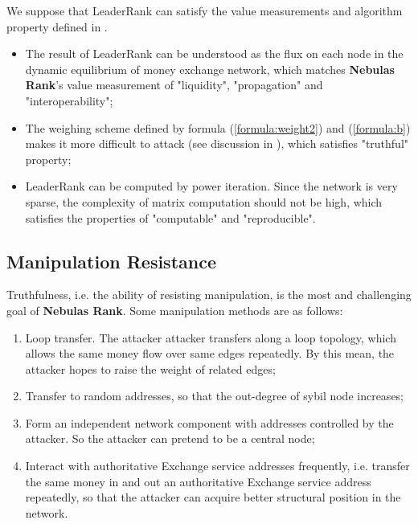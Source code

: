 We suppose that LeaderRank can satisfy the value measurements and algorithm property defined in .
\begin{itemize}
	\item The result of LeaderRank can be understood as the flux on each node in the dynamic equilibrium of money exchange network, which matches \textbf{Nebulas Rank}'s value measurement of "liquidity", "propagation" and "interoperability";
	\item The weighing scheme defined by formula (\ref{formula:weight2}) and (\ref{formula:b}) makes it more difficult to attack (see discussion in ), which satisfies "truthful" property;
	\item LeaderRank can be computed by power iteration. Since the network is very sparse, the complexity of matrix computation should not be high, which satisfies the properties of "computable" and "reproducible".
\end{itemize}


\subsection{Manipulation Resistance}\label{subsec:robust}
Truthfulness, i.e. the ability of resisting manipulation, is the most and challenging goal of \textbf{Nebulas Rank}. Some manipulation methods are as follows:
\begin{enumerate}
	\item Loop transfer. The attacker attacker transfers along a loop topology, which allows the same money flow over same edges repeatedly. By this mean, the attacker hopes to raise the weight of related edges;
	\item Transfer to random addresses, so that the out-degree of sybil node increases;
	\item Form an independent network component with addresses controlled by the attacker. So the attacker can pretend to be a central node;
	\item Interact with authoritative Exchange service addresses frequently, i.e. transfer the same money in and out an authoritative Exchange service address repeatedly, so that the attacker can acquire better structural position in the network.
\end{enumerate}

